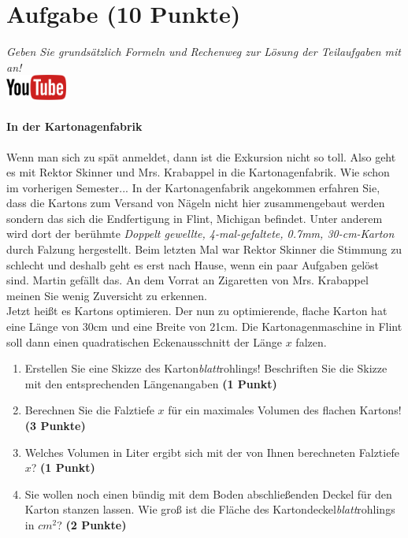 \documentclass[a4paper, 9pt]{scrartcl}\usepackage[]{graphicx}\usepackage[]{xcolor}
\begin{document}
\section{Aufgabe \hfill (10 Punkte)}

\textit{Geben Sie grunds{\"a}tzlich Formeln und Rechenweg zur L{\"o}sung der
  Teilaufgaben mit an!} \\[1Ex]

\hfill\href{https://youtu.be/RuzMjwvwT-4}{\includegraphics[width =
  2cm]{img/youtube}} %
\hspace{2Ex}

\paragraph{In der Kartonagenfabrik}



Wenn man sich zu sp{\"a}t anmeldet, dann ist die Exkursion nicht so toll. Also
geht es mit Rektor Skinner und Mrs. Krabappel in die Kartonagenfabrik. Wie
schon im vorherigen Semester... In der Kartonagenfabrik angekommen erfahren
Sie, dass die Kartons zum Versand von N{\"a}geln nicht hier zusammengebaut
werden sondern das sich die Endfertigung in Flint, Michigan befindet. Unter
anderem wird dort der ber{\"u}hmte \textit{Doppelt gewellte,
  4-mal-gefaltete, 0.7mm, 30-cm-Karton} durch
Falzung hergestellt. Beim letzten Mal war Rektor Skinner die Stimmung zu
schlecht und deshalb geht es erst nach Hause, wenn ein paar Aufgaben gel{\"o}st
sind. Martin gef{\"a}llt das. An dem Vorrat
an Zigaretten von Mrs. Krabappel meinen Sie wenig Zuversicht zu erkennen.\\

Jetzt hei{\ss}t es Kartons optimieren. Der nun zu optimierende, flache Karton
hat eine L{\"a}nge von 30cm und eine Breite von 21cm. Die
Kartonagenmaschine in Flint soll dann einen quadratischen Eckenausschnitt
der L{\"a}nge $x$ falzen.

\begin{enumerate}
\item Erstellen Sie eine Skizze des Karton\textit{blatt}rohlings!
  Beschriften Sie die Skizze mit den entsprechenden L{\"a}ngenangaben
  \textbf{(1 Punkt)}
\item Berechnen Sie die Falztiefe $x$ f{\"u}r ein maximales Volumen des flachen
  Kartons! \textbf{(3 Punkte)}
\item Welches Volumen in Liter ergibt sich mit der von Ihnen berechneten
  Falztiefe $x$?  \textbf{(1 Punkt)}
\item Sie wollen noch einen b{\"u}ndig mit dem Boden abschlie{\ss}enden Deckel f{\"u}r
  den Karton stanzen lassen. Wie gro{\ss} ist die Fl{\"a}che des
  Kartondeckel\textit{blatt}rohlings in $cm^2$? \textbf{(2 Punkte)}
\end{enumerate}
\end{document}
